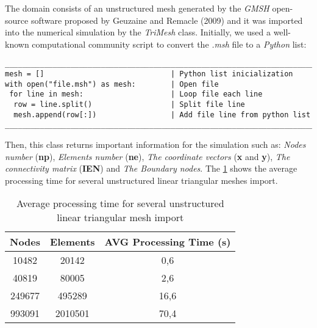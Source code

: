 The domain consists of an unstructured mesh generated by 
the \textit{GMSH} open-source software proposed by 
Geuzaine and Remacle (2009) \cite{gmsh} and 
it was imported into the numerical simulation by 
the \textit{TriMesh} class. 
Initially, we used a well-known computational community script to 
convert the \textit{.msh} file to a 
\textit{Python} list:

\begin{verbatim}
__________________________________________________________________________
mesh = []                             | Python list inicialization
with open("file.msh") as mesh:        | Open file 
 for line in mesh:                    | Loop file each line
  row = line.split()                  | Split file line
  mesh.append(row[:])                 | Add file line from python list 
__________________________________________________________________________
\end{verbatim}

\noindent
Then, this class returns important information for the simulation 
such as:
\textit{Nodes number} (\textbf{np}), 
\textit{Elements number} (\textbf{ne}), 
\textit{The coordinate vectors} (\textbf{x} and \textbf{y}), 
\textit{The connectivity matrix} (\textbf{IEN}) and 
\textit{The Boundary nodes}. 
The \ref{tempo malha} shows the average processing time for 
several unstructured linear triangular meshes import.

\vspace{0.5cm}
\begin{table}[H]
\centering
\begin{tabular}{ccc}
\toprule
\textbf{Nodes} & \textbf{Elements} & \textbf{AVG Processing Time} (s) \\
\midrule
10482 & 20142 & 0,6 \\
40819 & 80005 & 2,6 \\
249677 & 495289 & 16,6 \\
993091 & 2010501 & 70,4 \\
\bottomrule
\end{tabular}
\caption{Average processing time for several unstructured linear triangular mesh import}
\label{tempo malha}
\end{table}

\newpage
